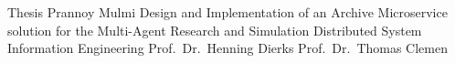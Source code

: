 



													{ Thesis }																			%
													{Prannoy Mulmi}														%
													{Design and Implementation of an Archive Microservice solution for the Multi-Agent Research and
													Simulation Distributed System}											  %
													{Information Engineering}						%
													{Prof.\ Dr.\ Henning Dierks}					%
													{Prof.\ Dr.\ Thomas Clemen}								%
													


